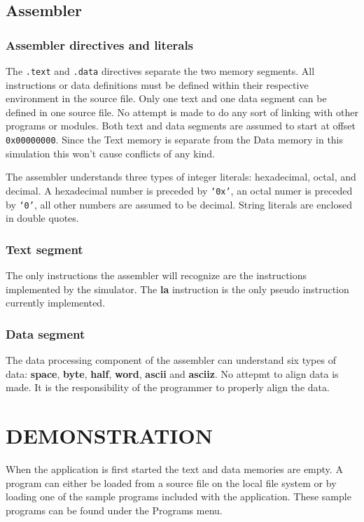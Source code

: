 \documentclass[]{spie}
\begin{document}
\subsection{Assembler}

\subsubsection{Assembler directives and literals}
The {\tt .text} and {\tt .data} directives separate the two memory segments. All instructions or data definitions must
be defined within their respective environment in the source file. Only one text and one data segment can be defined in
one source file. No attempt is made to do any sort of linking with other programs or modules. Both text and data segments are
assumed to start at offset {\tt 0x00000000}. Since the Text memory is separate from the Data memory in this simulation this
won't cause conflicts of any kind.

The assembler understands three types of integer literals: hexadecimal, octal, and decimal. A hexadecimal number is preceded by
{\tt `0x'}, an octal numer is preceded by {\tt `0'}, all other numbers are assumed to be decimal. String literals are enclosed in
double quotes. 

\subsubsection{Text segment}
The only instructions the assembler will recognize are the instructions
implemented by the simulator. The {\bf la} instruction is the only pseudo instruction currently implemented.

\subsubsection{Data segment}
The data processing component of the assembler can understand six types of data: {\bf space}, {\bf byte}, {\bf half}, {\bf word}, {\bf ascii} and {\bf asciiz}.
No attepmt to align data is made. It is the responsibility of the programmer to properly align the data.

\section{DEMONSTRATION}
When the application is first started the text and data memories are empty. A program can either be loaded from 
a source file on the local file system or by loading one of the sample programs included with the application. These sample
programs can be found under the Programs menu.
\end{document}
